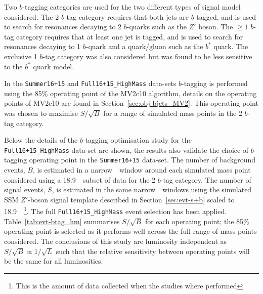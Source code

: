 Two $b$-tagging categories are used for the two different types of signal model considered.
The 2 $b$-tag category requires that both jets are $b$-tagged,
and is used to search for resonances decaying to 2 $b$-quarks such as the $Z'$ boson.
The $\geq 1$ $b$-tag category requires that at least one jet is tagged,
and is used to search for resonances decaying to 1 $b$-quark and a quark/gluon such as the $b^*$ quark.
The exclusive 1 $b$-tag category was also considered but was found to be less sensitive to the $b^*$ quark model.

In the \verb|Summer16+15| and \verb|Full16+15_HighMass| data-sets
$b$-tagging is performed using the 85\% operating point of the MV2c10 algorithm,
details on the operating points of MV2c10 are found in Section~\ref{sec:obj-bjets_MV2}.
This operating point was chosen to maximise $S/\sqrt{B}$ for a range of simulated mass points in the 2 $b$-tag category.

Below the details of the $b$-tagging optimisation study for the \verb|Full16+15_HighMass| data-set are shown,
the results also validate the choice of $b$-tagging operating point in the \verb|Summer16+15| data-set.
The number of background events, $B$, is estimated in
a narrow~\mjj~window around
each simulated mass point considered using a
18.9~\ifb~subset of data for the 2 $b$-tag category.
The number of signal events, $S$, is estimated
in the same narrow~\mjj~windows using 
the simulated SSM $Z'$-boson signal template
described in Section~\ref{sec:evt-s+b} scaled to 18.9~\ifb~\footnote{This is
  the amount of data collected when the studies where performed}.
The full \verb|Full16+15_HighMass| event selection has been applied.
Table~\ref{tab:evt-btag_hm} summarises $S/\sqrt{B}$ for each operating point;
the 85\% operating point is selected as it performs well across the full range of mass points considered.
The conclusions of this study are luminosity independent
as $S/\sqrt{B} \propto 1/\sqrt{L}$ such that the relative sensitivity
between operating points will be the same for all luminosities.

